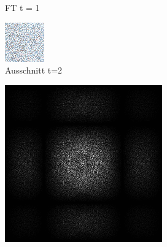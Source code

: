 \begin{figure}[H]
\begin{subfigure}[b]{0.2\linewidth}
         \caption{FT t = 1}
         \label{pic:retarget_t1}
    \end{subfigure}
    \begin{subfigure}[b]{0.2\linewidth}
        \includegraphics[width=\linewidth]{content/TemporalerAlg/Bilder/Retargeting/Bedeutung Retargeting/RetargetSerie/seed_debug_5.0_small_screen.png}
         \caption{Ausschnitt t=2}
         \label{pic:retarget_screen_t2}
    \end{subfigure}
    \begin{subfigure}[b]{0.2\linewidth}
        \includegraphics[width=\linewidth]{content/TemporalerAlg/Bilder/Retargeting/Bedeutung Retargeting/RetargetSerie/seed_debug_5.0_small.png}

\end{subfigure}
\end{figure}
